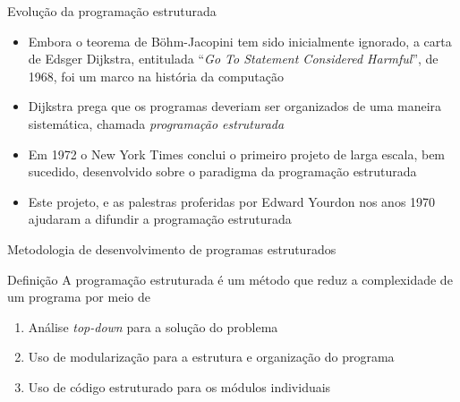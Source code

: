 \begin{frame}[fragile]{Evolução da programação estruturada}

    \begin{itemize}
        \item Embora o teorema de Böhm-Jacopini tem sido inicialmente ignorado, a carta de Edsger
            Dijkstra, entitulada ``\textit{Go To Statement Considered Harmful}'', de 1968, foi
            um marco na história da computação

        \item Dijkstra prega que os programas deveriam ser organizados de uma maneira sistemática,
            chamada \textit{programação estruturada}

        \item Em 1972 o New York Times conclui o primeiro projeto de larga escala, bem sucedido,
            desenvolvido sobre o paradigma da programação estruturada

        \item Este projeto, e as palestras proferidas por Edward Yourdon nos anos 1970 ajudaram a
            difundir a programação estruturada
    \end{itemize}

\end{frame}

\begin{frame}[fragile]{Metodologia de desenvolvimento de programas estruturados}

    \begin{block}{Definição}
        A programação estruturada é um método que reduz a complexidade de um programa por meio de

        \begin{enumerate}
            \item Análise \textit{top-down} para a solução do problema
            \item Uso de modularização para a estrutura e organização do programa
            \item Uso de código estruturado para os módulos individuais
        \end{enumerate}
    \end{block}

\end{frame}

